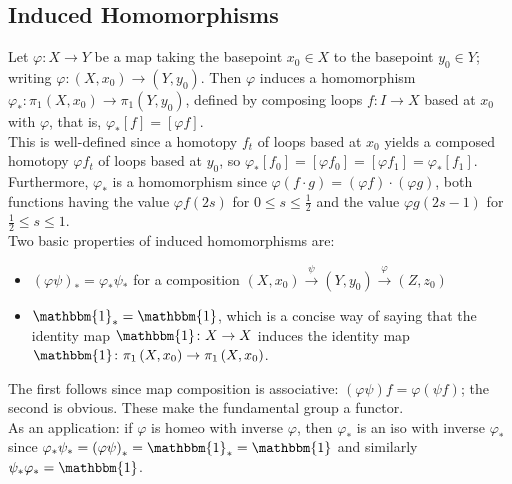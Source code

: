 \documentclass[a4paper]{article}
\begin{document}
\subsection*{Induced Homomorphisms}
Let $\varphi  \colon X \to Y$ be a map taking the basepoint $x_0 \in X$ to the
basepoint $y_0 \in Y$; writing $\varphi  \colon \left( X, x_0 \right) \to
\left( Y, y_0 \right) $. Then $\varphi$ induces a homomorphism
 $\varphi_{*} \colon \pi_1 \left( X, x_0 \right) \to \pi_1 \left( Y, y_0
 \right) $, defined by composing loops $f \colon I\to X$ based at $x_0$ with 
 $\varphi$, that is, $\varphi_{*}\left[ f \right] = \left[ \varphi f \right]
 $.\\
 This is well-defined since a homotopy $f_t$ of loops based at $x_0$ yields
 a composed homotopy $\varphi f_t$ of loops based at $y_0$, so
 $\varphi_{*}\left[ f_0 \right] = \left[ \varphi f_0 \right] 
 = \left[ \varphi f_1 \right] = \varphi_{*}\left[ f_1 \right] $.
 Furthermore, $\varphi_{*}$ is a homomorphism since 
 $\varphi \left( f\cdot g \right) = \left( \varphi f \right) \cdot \left(
 \varphi g \right) $, both functions having the value
 $\varphi f(2s)$ for $0 \le s\le \frac{1}{2}$ and the value
 $\varphi g\left( 2s-1 \right) $ for $\frac{1}{2} \le  s \le 1$.\\
 \linebreak
 Two basic properties of induced homomorphisms are:
 \begin{itemize}
     \item $\left( \varphi \psi \right)_{*} = \varphi_{*} \psi_{*}$ for a 
         composition $\left( X, x_0 \right) \xrightarrow{\psi} \left( Y, y_0 \right) 
         \xrightarrow{\varphi} \left( Z, z_0 \right) $
     \item $\mathbbm{1}_* = \mathbbm{1}$, which is a concise way of saying that
         the identity map $\mathbbm{1}  \colon X \to X$ induces the identity
         map $\mathbbm{1}  \colon \pi_1 \left( X, x_0 \right) \to 
         \pi_1 \left( X, x_0 \right) $.
 \end{itemize}
 The first follows since map composition is associative: 
 $\left( \varphi \psi \right) f = \varphi \left( \psi f \right) $; the second
 is obvious. These make the fundamental group a functor.\\
 \linebreak
 As an application: if $\varphi$ is homeo with inverse $\varphi$, then
 $\varphi_*$ is an iso with inverse $\varphi_*$ since
 $\varphi_* \psi_* = \left( \varphi \psi  \right)_* = \mathbbm{1}_* = \mathbbm{1}$ 
 and similarly $\psi_* \varphi_* = \mathbbm{1}$.
\end{document}
